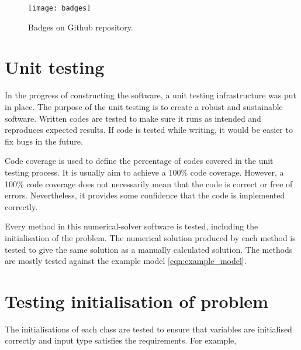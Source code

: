 \begin{figure}
    \texttt{[image: badges]}
    \caption{Badges on Github repository.}
    \label{fig:badges}
 \end{figure}

\section{Unit testing}
\label{sec:testing}
In the progress of constructing the software, a unit testing infrastructure was put in place. The purpose of the unit testing is to create a robust and sustainable software. Written codes are tested to make sure it runs as intended and reproduces expected results. If code is tested while writing, it would be easier to fix bugs in the future. 

Code coverage is used to define the percentage of codes covered in the unit testing process. It is usually aim to achieve a 100\% code coverage. However, a 100\% code coverage does not necessarily mean that the code is correct or free of errors. Nevertheless, it provides some confidence that the code is implemented correctly.

Every method in this numerical-solver software is tested, including the initialisation of the problem. The numerical solution produced by each method is tested to give the same solution as a manually calculated solution. The methods are mostly tested against the example model \ref{eqn:example_model}.

\section{Testing initialisation of problem}
\label{sec:test_init}
The initialisations of each class are tested to ensure that variables are initialised correctly and input type satisfies the requirements. For example, 

